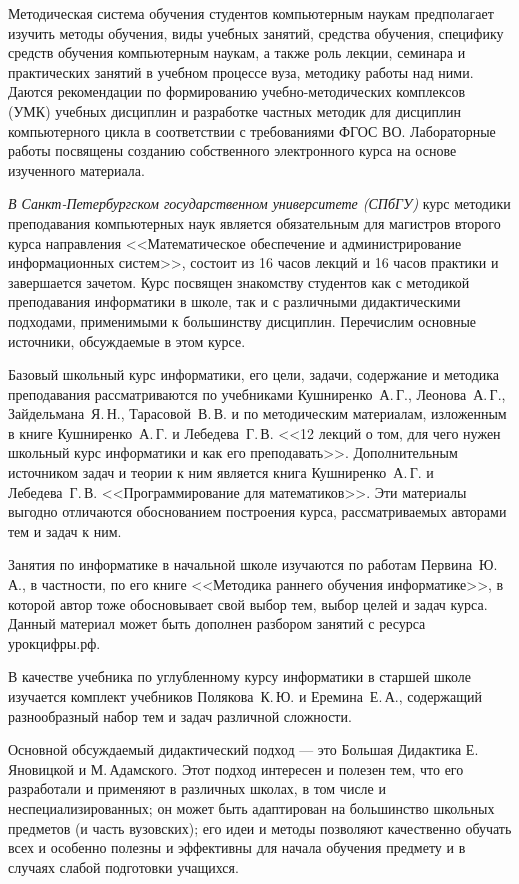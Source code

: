 \documentclass{math-mech-sci}
\begin{document}
Методическая система обучения студентов компьютерным наукам предполагает изучить методы обучения, виды учебных занятий, средства обучения, специфику средств обучения компьютерным наукам, а также роль лекции, семинара и практических занятий в учебном процессе вуза, методику работы над ними.
Даются рекомендации по формированию учебно-методических комплексов (УМК) учебных дисциплин и разработке частных методик для дисциплин компьютерного цикла в соответствии с требованиями ФГОС ВО.
Лабораторные работы посвящены созданию собственного электронного курса на основе изученного материала.





{\it В Санкт-Петербургском государственном университете (СПбГУ)} курс методики преподавания компьютерных наук является обязательным для магистров второго курса направления <<Математическое обеспечение и администрирование информационных систем>>, состоит из 16 часов лекций и 16 часов практики и завершается зачетом. Курс посвящен знакомству студентов как с методикой преподавания информатики в школе, так и с различными дидактическими подходами, применимыми к большинству дисциплин. Перечислим основные источники, обсуждаемые в этом курсе.

Базовый школьный курс информатики, его цели, задачи, содержание и методика преподавания рассматриваются по учебниками Кушниренко~А.\,Г., Леонова~А.\,Г., Зайдельмана~Я.\,Н., Тарасовой~В.\,В. и по методическим материалам, изложенным в книге Кушниренко~А.\,Г. и Лебедева~Г.\,В. <<12 лекций о том, для чего нужен школьный курс информатики и как его преподавать>>. Дополнительным источником задач и теории к ним является книга Кушниренко~А.\,Г. и Лебедева~Г.\,В. <<Программирование для математиков>>. Эти материалы выгодно отличаются обоснованием построения курса, рассматриваемых авторами тем и задач к ним.

Занятия по информатике в начальной школе изучаются по работам Первина~Ю.\,А., в частности, по его книге <<Методика раннего обучения информатике>>, в которой автор тоже обосновывает свой выбор тем, выбор целей и задач курса. Данный материал может быть дополнен разбором занятий с ресурса урокцифры.рф.

В качестве учебника по углубленному курсу информатики в старшей школе изучается комплект учебников Полякова~К.\,Ю. и Еремина~Е.\,А., содержащий разнообразный набор тем и задач различной сложности.

Основной обсуждаемый дидактический подход --- это Большая Дидактика Е.\,Яновицкой и М.\,Адамского. Этот подход интересен и полезен тем, что его разработали и применяют в различных школах, в том числе и неспециализированных; он может быть адаптирован на большинство школьных предметов (и часть вузовских); его идеи и методы позволяют качественно обучать всех и особенно полезны и эффективны для начала обучения предмету и в случаях слабой подготовки учащихся.
\end{document}
